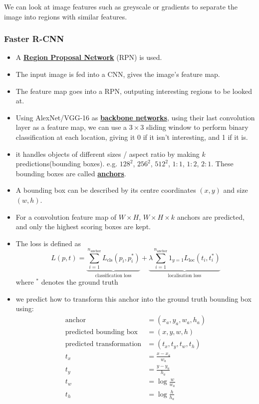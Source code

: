 \documentclass[twocolumn,landscape,10pt]{article}
\theoremstyle{definition}
\begin{document}
We can look at image features such as greyscale or gradients to separate the
image into regions with similar features.

\subsubsection{Faster R-CNN}


\begin{itemize}
    \item A \underline{\textbf{Region Proposal Network}} (RPN) is used.
    \item The input image is fed into a CNN, gives the image's feature map.
    \item The feature map goes into a RPN, outputing interesting regions to be
        looked at.
    \item Using AlexNet/VGG-16 as \underline{\textbf{backbone networks}}, using
        their last convolution layer as a feature map, we can use a $3\times 3$
        sliding window to perform binary classification at each location,
        giving it 0 if it isn't interesting, and 1 if it is.
    \item it handles objects of different sizes / aspect ratio by making $k$
        predictions(bounding boxes). e.g. $128^2$, $256^2$, $512^2$, $1:1$,
        $1:2$, $2:1$. These bounding boxes are called
        \underline{\textbf{anchors}}.
    \item A bounding box can be described by its centre coordinates $(x,y)$ and
        size $(w,h)$.
    \item For a convolution feature map of $W\times H$, $W\times H \times k$
        anchors are predicted, and only the highest scoring boxes are kept.
    \item The loss is defined as
        \[
            L(p,t) = \underbrace {\sum_{i=1}^{n_\text{anchor}} 
            L_\text{cls}(p_i,p_i^*)}_{\text{classification loss}} +
            \underbrace{\lambda\sum_{i=1}^{n_\text{anchor}}
            1_{y=1}L_\text{loc}(t_i,t_i^*)}_{\text{localisation loss}}
        \]
        where $^*$ denotes the ground truth
    \item we predict how to transform this anchor into the ground truth bounding
        box using:
        \begin{align*}
            \text{anchor} & = (x_a, y_a, w_a, h_a) \\
            \text{predicted bounding box} & = (x,y,w,h) \\
            \text{predicted transformation} & = (t_x,t_y,t_w,t_h) \\
            t_x & = \frac{x-x_a}{w_a} \\
            t_y & = \frac{y-y_a}{h_a} \\
            t_w & = \log{\frac{w}{w_a}} \\
            t_h & = \log{\frac{h}{h_a}}
        \end{align*} 
\end{itemize} 
\end{document}
